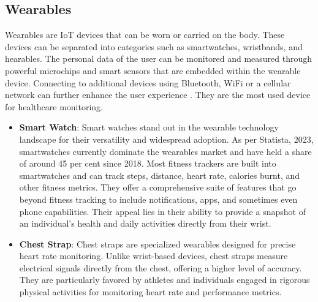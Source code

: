 
\subsection{Wearables}

Wearables are IoT devices that can be worn or carried on the body. These devices can be separated into categories such as smartwatches, wristbands, and hearables. The personal data of the user can be monitored and measured through powerful microchips and smart sensors that are embedded within the wearable device. Connecting to additional devices using Bluetooth, WiFi or a cellular network can further enhance the user experience \cite{ref17}. They are the most used device for healthcare monitoring. 

\begin{itemize}
    \item \textbf{Smart Watch}: Smart watches stand out in the wearable technology landscape for their versatility and widespread adoption. As per Statista, 2023, smartwatches currently dominate the wearables market and have held a share of around 45 per cent since 2018. Most fitness trackers are built into smartwatches and can track steps, distance, heart rate, calories burnt, and other fitness metrics. They offer a comprehensive suite of features that go beyond fitness tracking to include notifications, apps, and sometimes even phone capabilities. Their appeal lies in their ability to provide a snapshot of an individual's health and daily activities directly from their wrist.
    \item \textbf{Chest Strap}: Chest straps are specialized wearables designed for precise heart rate monitoring. Unlike wrist-based devices, chest straps measure electrical signals directly from the chest, offering a higher level of accuracy. They are particularly favored by athletes and individuals engaged in rigorous physical activities for monitoring heart rate and performance metrics.
\end{itemize}

